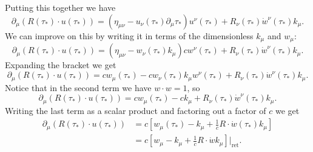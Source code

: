 \documentclass[fleqn]{NotesClass}
\newcommand*{\ret}{{\text{ret}}}
\begin{document}
    Putting this together we have
    \begin{equation}
        \partial_\mu(R(\tau_*) \cdot u(\tau_*)) = (\eta_{\mu\nu} - u_\nu(\tau_*)\partial_\mu \tau_*)u^\nu(\tau_*) + R_\nu(\tau_*) \dot{w}^\nu(\tau_*) k_\mu.
    \end{equation}
    We can improve on this by writing it in terms of the dimensionless \(k_\mu\) and \(w_\mu\):
    \begin{equation}
        \partial_\mu(R(\tau_*) \cdot u(\tau_*)) = (\eta_{\mu\nu} - w_\nu(\tau_*)k_\mu)cw^\nu(\tau_*) + R_\nu(\tau_*) \dot{w}^\nu(\tau_*) k_\mu.
    \end{equation}
    Expanding the bracket we get
    \begin{equation}
        \partial_\mu(R(\tau_*) \cdot u(\tau_*)) = cw_\mu(\tau_*) - cw_\nu(\tau_*)k_\mu w^\nu(\tau_*) + R_\nu(\tau_*) \dot w^\nu(\tau_*) k_\mu.
    \end{equation}
    Notice that in the second term we have \(w \cdot w = 1\), so
    \begin{equation}
        \partial_\mu(R(\tau_*) \cdot u(\tau_*)) = cw_\mu(\tau_*) - ck_\mu + R_\nu(\tau_*) \dot{w}^\nu(\tau_*) k_\mu.
    \end{equation}
    Writing the last term as a scalar product and factoring out a factor of \(c\) we get
    \begin{align}
        \partial_\mu(R(\tau_*) \cdot u(\tau_*)) &= c\left[ w_\mu(\tau_*) - k_\mu + \frac{1}{c} R \cdot \dot{w}(\tau_*) k_\mu  \right]\\
        &= c\left[ w_\mu - k_\mu + \frac{1}{c}R \cdot \dot{w}k_\mu \right]\bigg|_{\ret}.
    \end{align}
    
\end{document}
